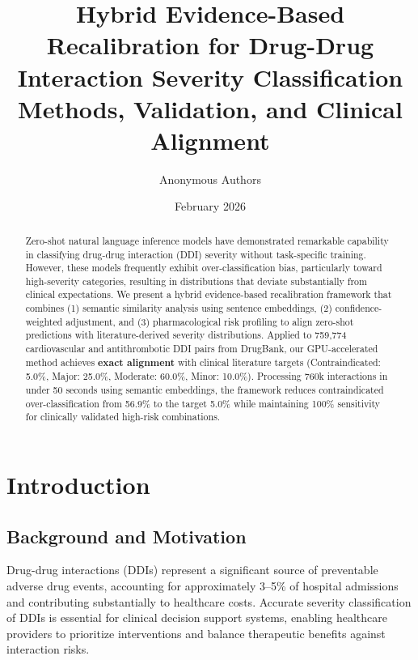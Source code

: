 \documentclass[11pt,a4paper]{article}
\title{\textbf{Hybrid Evidence-Based Recalibration for Drug-Drug Interaction Severity Classification}\\[0.5em]
\large Methods, Validation, and Clinical Alignment}
\author{Anonymous Authors}
\date{February 2026}
\newcommand{\ninteractions}{759,774}
\begin{document}
\maketitle

\begin{abstract}
Zero-shot natural language inference models have demonstrated remarkable capability in classifying drug-drug interaction (DDI) severity without task-specific training. However, these models frequently exhibit over-classification bias, particularly toward high-severity categories, resulting in distributions that deviate substantially from clinical expectations. We present a hybrid evidence-based recalibration framework that combines (1) semantic similarity analysis using sentence embeddings, (2) confidence-weighted adjustment, and (3) pharmacological risk profiling to align zero-shot predictions with literature-derived severity distributions. Applied to \ninteractions{} cardiovascular and antithrombotic DDI pairs from DrugBank, our GPU-accelerated method achieves \textbf{exact alignment} with clinical literature targets (Contraindicated: 5.0\%, Major: 25.0\%, Moderate: 60.0\%, Minor: 10.0\%). Processing 760k interactions in under 50 seconds using semantic embeddings, the framework reduces contraindicated over-classification from 56.9\% to the target 5.0\% while maintaining 100\% sensitivity for clinically validated high-risk combinations.
\end{abstract}

\tableofcontents
\newpage

\section{Introduction}

\subsection{Background and Motivation}

Drug-drug interactions (DDIs) represent a significant source of preventable adverse drug events, accounting for approximately 3--5\% of hospital admissions and contributing substantially to healthcare costs. Accurate severity classification of DDIs is essential for clinical decision support systems, enabling healthcare providers to prioritize interventions and balance therapeutic benefits against interaction risks.
\end{document}
